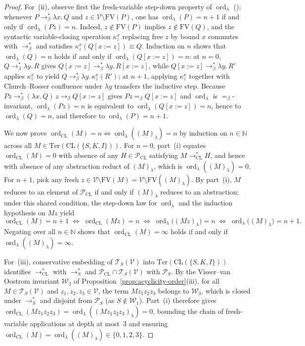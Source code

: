 \documentclass[11pt,reqno]{amsart}
\numberwithin{equation}{section}
\theoremstyle{plain}
\theoremstyle{definition}
\theoremstyle{remark}
\DeclareMathOperator{\ord}{ord}
\newcommand{\TSV}{\mathcal{T}_S(\mathcal{V})}
\newcommand{\redSs}{\to_S^*}
\begin{document}
\begin{proof}
For~(ii), observe first the fresh-variable step-down property of $\ord_\lambda$ (\cite[Example~36(iv), p.~99]{BarendregtEndrullisKlopWaldmann2017}): whenever $P \to_\beta^* \lambda x.\, Q$ and $z \in \mathcal{V} \setminus \mathrm{FV}(P)$, one has $\ord_\lambda(P) = n + 1$ if and only if $\ord_\lambda(P z) = n$. Indeed, $z \notin \mathrm{FV}(P)$ implies $z \notin \mathrm{FV}(Q)$, and the syntactic variable-closing operation $\kappa_z^x$ replacing free $z$ by bound $x$ commutes with $\to_\beta^*$ and satisfies $\kappa_z^x(Q[x := z]) \equiv Q$. Induction on $n$ shows that $\ord_\lambda(Q) = n$ holds if and only if $\ord_\lambda(Q[x := z]) = n$: at $n = 0$, $Q \to_\beta^* \lambda y.\, R$ gives $Q[x := z] \to_\beta^* \lambda y.\, R[x := z]$, while $Q[x := z] \to_\beta^* \lambda y.\, R'$ applies $\kappa_z^x$ to yield $Q \to_\beta^* \lambda y.\, \kappa_z^x(R')$; at $n + 1$, applying $\kappa_z^x$ together with Church--Rosser confluence under $\lambda y$ transfers the inductive step. Because $P z \to_\beta^* (\lambda x.\, Q)\,z \to_\beta Q[x := z]$ gives $P z =_\beta Q[x := z]$ and $\ord_\lambda$ is $=_\beta$-invariant, $\ord_\lambda(P z) = n$ is equivalent to $\ord_\lambda(Q[x := z]) = n$, hence to $\ord_\lambda(Q) = n$, and therefore to $\ord_\lambda(P) = n + 1$.

We now prove $\ord_{\mathrm{CL}}(M) = n \iff \ord_\lambda((M)_\lambda) = n$ by induction on $n \in \mathbb{N}$ across all $M \in \mathrm{Ter}(\mathrm{CL}(\{S, K, I\}))$. For $n = 0$, part~(i) equates $\ord_{\mathrm{CL}}(M) = 0$ with absence of any $H \in \mathcal{P}_{\mathrm{CL}}$ satisfying $M \to_{\mathrm{CL}}^* H$, and hence with absence of any abstraction reduct of $(M)_\lambda$, which is $\ord_\lambda((M)_\lambda) = 0$. For $n + 1$, pick any fresh $z \in \mathcal{V} \setminus \mathrm{FV}(M) = \mathcal{V} \setminus \mathrm{FV}((M)_\lambda)$. By part~(i), $M$ reduces to an element of $\mathcal{P}_{\mathrm{CL}}$ if and only if $(M)_\lambda$ reduces to an abstraction; under this shared condition, the step-down law for $\ord_\lambda$ and the induction hypothesis on $M z$ yield
\[
  \ord_{\mathrm{CL}}(M) = n + 1 \;\iff\; \ord_{\mathrm{CL}}(M z) = n \;\iff\; \ord_\lambda\bigl((M z)_\lambda\bigr) = n \;\iff\; \ord_\lambda\bigl((M)_\lambda\bigr) = n + 1.
\]
Negating over all $n \in \mathbb{N}$ shows that $\ord_{\mathrm{CL}}(M) = \infty$ holds if and only if $\ord_\lambda((M)_\lambda) = \infty$.

For~(iii), conservative embedding of $\TSV$ into $\mathrm{Ter}(\mathrm{CL}(\{S, K, I\}))$ identifies $\to_{\mathrm{CL}}^*$ with $\redSs$ and $\mathcal{P}_{\mathrm{CL}} \cap \TSV$ with $\mathcal{P}_S$. By the Visser--van Oostrom invariant $\mathcal{W}_3$ of Proposition~\ref{prop:acyclicity-order}(iii), for all $M \in \TSV$ and $z_1, z_2, z_3 \in \mathcal{V}$, the term $M z_1 z_2 z_3$ belongs to $\mathcal{W}_3$, which is closed under $\redSs$ and disjoint from $\mathcal{P}_S$ (as $S \notin \mathcal{W}_1$). Part~(i) therefore gives $\ord_{\mathrm{CL}}(M z_1 z_2 z_3) = \ord_\lambda((M z_1 z_2 z_3)_\lambda) = 0$, bounding the chain of fresh-variable applications at depth at most~$3$ and ensuring $\ord_{\mathrm{CL}}(M) = \ord_\lambda((M)_\lambda) \in \{0, 1, 2, 3\}$.
\end{proof}
\end{document}
